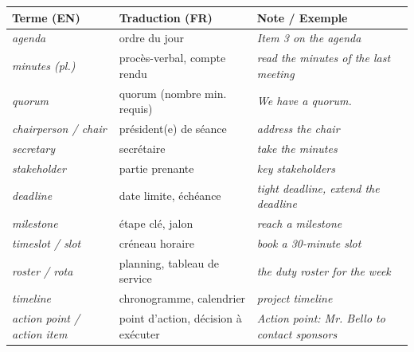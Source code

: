 \documentclass[11pt]{article}
\newcommand{\eng}[1]{\ifmmode\text{\textit{#1}}\else\begingroup\selectlanguage{english}\itshape #1\endgroup\fi}
\begin{document}
\begin{definition}
\begin{center}
\begin{tabularx}{\linewidth}{|X|X|X|}\hline
\rowcolor{poporangeL} \textbf{Terme (EN)} & \textbf{Traduction (FR)} & \textbf{Note / Exemple} \\ \hline
\eng{agenda} & ordre du jour & \eng{Item 3 on the agenda} \\ \hline
\eng{minutes} (pl.) & procès-verbal, compte rendu & \eng{read the minutes of the last meeting} \\ \hline
\eng{quorum} & quorum (nombre min. requis) & \eng{We have a quorum.} \\ \hline
\eng{chairperson} / \eng{chair} & président(e) de séance & \eng{address the chair} \\ \hline
\eng{secretary} & secrétaire & \eng{take the minutes} \\ \hline
\eng{stakeholder} & partie prenante & \eng{key stakeholders} \\ \hline
\eng{deadline} & date limite, échéance & \eng{tight deadline, extend the deadline} \\ \hline
\eng{milestone} & étape clé, jalon & \eng{reach a milestone} \\ \hline
\eng{timeslot} / \eng{slot} & créneau horaire & \eng{book a 30-minute slot} \\ \hline
\eng{roster} / \eng{rota} & planning, tableau de service & \eng{the duty roster for the week} \\ \hline
\eng{timeline} & chronogramme, calendrier & \eng{project timeline} \\ \hline
\eng{action point} / \eng{action item} & point d'action, décision à exécuter & \eng{Action point: Mr. Bello to contact sponsors} \\ \hline
\end{tabularx}
\end{center}
\end{definition}
\end{document}
